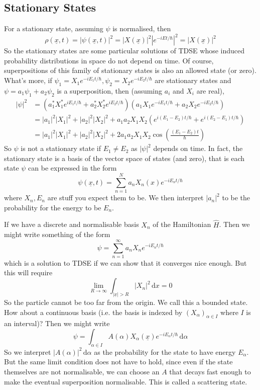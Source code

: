 \subsection{Stationary States}
For a stationary state, assuming $\psi$ is normalised, then
$$\rho(\underline{x},t)=|\psi(\underline{x},t)|^2=|X(\underline{x})|^2|e^{-iEt/\hbar}|^2=|X(\underline{x})|^2$$
So the stationary states are some particular solutions of TDSE whose induced probability distributions in space do not depend on time.
Of course, superpositions of this family of stationary states is also an allowed state (or zero).
What's more, if $\psi_1=X_1e^{-iE_1t/\hbar},\psi_2=X_2e^{-iE_2t/\hbar}$ are stationary states and $\psi=a_1\psi_1+a_2\psi_2$ is a superposition, then (assuming $a_i$ and $X_i$ are real),
\begin{align*}
    |\psi|^2&=(a_1^*X_1^*e^{iE_1t/\hbar}+a_2^*X_2^*e^{iE_2t/\hbar})(a_1X_1e^{-iE_1t/\hbar}+a_2X_2e^{-iE_2t/\hbar})\\
    &=|a_1|^2|X_1|^2+|a_2|^2|X_2|^2+a_1a_2X_1X_2(e^{i(E_1-E_2)t/\hbar}+e^{i(E_2-E_1)t/\hbar})\\
    &=|a_1|^2|X_1|^2+|a_2|^2|X_2|^2+2a_1a_2X_1X_2\cos\left( \frac{(E_1-E_2)t}{\hbar} \right)
\end{align*}
So $\psi$ is not a stationary state if $E_1\neq E_2$ as $|\psi|^2$ depends on time.
In fact, the stationary state is a basis of the vector space of states (and zero), that is each state $\psi$ can be expressed in the form
$$\psi(\underline{x},t)=\sum_{n=1}^Na_nX_n(x)e^{-iE_nt/\hbar}$$
where $X_n,E_n$ are stuff you expect them to be.
We then interpret $|a_n|^2$ to be the probability for the energy to be $E_n$.
\begin{remark}
    If we have a discrete and normalisable basis $X_n$ of the Hamiltonian $\hat{H}$.
    Then we might write something of the form
    $$\psi=\sum_{n=1}^\infty a_nX_ne^{-iE_nt/\hbar}$$
    which is a solution to TDSE if we can show that it converges nice enough.
    But this will require
    $$\lim_{R\to\infty}\int_{|\underline{x}|>R}|X_n|^2\,\mathrm dx=0$$
    So the particle cannot be too far from the origin.
    We call this a bounded state.\\
    How about a continuous basis (i.e. the basis is indexed by $(X_\alpha)_{\alpha\in I}$ where $I$ is an interval)?
    Then we might write
    $$\psi=\int_{\alpha\in I}A(\alpha)X_\alpha(\underline{x})e^{-iE_\alpha t/\hbar}\,\mathrm d\alpha$$
    So we interpret $|A(\alpha)|^2\,\mathrm d\alpha$ as the probability for the state to have energy $E_\alpha$.
    But the same limit condition does not have to hold, since even if the state themselves are not normalisable, we can choose an $A$ that decays fast enough to make the eventual superposition normalisable.
    This is called a scattering state.
\end{remark}